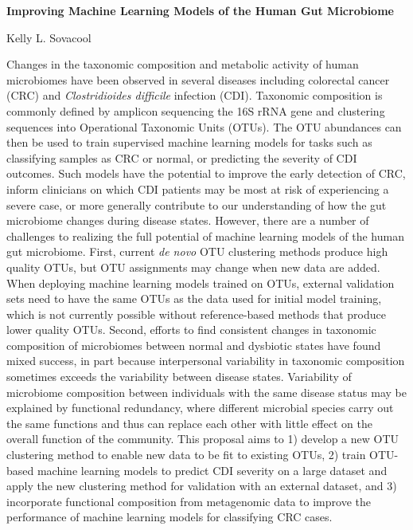 \documentclass[11pt]{article}
\begin{document}
\sloppy
\begin{center}
\large{\textbf{
    Improving Machine Learning Models of the Human Gut Microbiome
}}

\vspace{11pt}

\small{
    Kelly L. Sovacool
}
\end{center}

Changes in the taxonomic composition and metabolic activity of human microbiomes
have been observed in several diseases including colorectal cancer (CRC) and
\textit{Clostridioides difficile} infection (CDI).
Taxonomic composition is commonly defined by amplicon sequencing the 16S rRNA
gene and clustering sequences into Operational Taxonomic Units (OTUs).
The OTU abundances can then be used to train supervised machine learning 
models for tasks such as classifying samples as CRC or normal, or predicting the
severity of CDI outcomes.
Such models have the potential to improve the early detection of CRC, inform
clinicians on which CDI patients may be most at risk of experiencing a severe
case, or more generally contribute to our understanding of how the gut
microbiome changes during disease states.
However, there are a number of challenges to realizing the full 
potential of machine learning models of the human gut microbiome.
First, current \textit{de novo} OTU clustering methods produce high quality
OTUs, but OTU assignments may change when new data are added.
When deploying machine learning models trained on OTUs, external validation sets
need to have the same OTUs as the data used for initial model training, which is
not currently possible without reference-based methods that produce lower
quality OTUs.
Second, efforts to find consistent changes in taxonomic composition of
microbiomes between normal and dysbiotic states have found mixed success, in
part because interpersonal variability in taxonomic composition sometimes
exceeds the variability between disease states.
Variability of microbiome composition between individuals with the same disease
status may be explained by functional redundancy, where different microbial
species carry out the same functions and thus can replace each other with little
effect on the overall function of the community.
This proposal aims to 
1) develop a new OTU clustering method to enable new data to be fit to existing
OTUs, 
2) train OTU-based machine learning models to predict CDI severity on a large
dataset and apply the new clustering method for validation with an external
dataset, and 
3) incorporate functional composition from metagenomic data to improve the
performance of machine learning models for classifying CRC cases.
\end{document}

